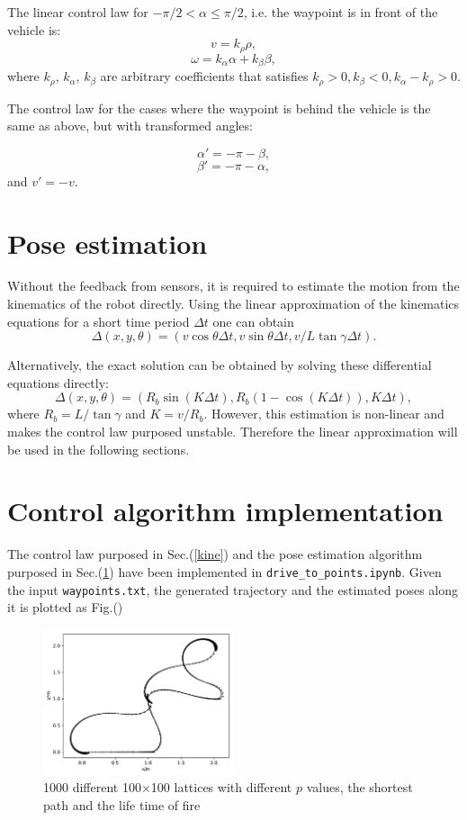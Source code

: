 \documentclass[12pt]{article}
\begin{document}
The linear control law for $-\pi/2<\alpha\le \pi/2$, i.e. the waypoint is in front of the vehicle is:
$$v=k_\rho \rho,$$
$$\omega=k_\alpha \alpha+k_\beta \beta,$$
where $k_\rho$, $k_\alpha$, $k_\beta$ are arbitrary coefficients that satisfies $k_\rho>0, k_\beta<0,k_\alpha-k_\rho>0.$

The control law for the cases where the waypoint is behind the vehicle is the same as above, but with transformed angles:

$$\alpha'=-\pi-\beta,$$
$$\beta'=-\pi-\alpha,$$
and $v'=-v$.

\section{Pose estimation}
\label{pose}
Without the feedback from sensors, it is required to estimate the motion from the kinematics of the robot directly. Using the linear approximation of the kinematics equations for a short time period $\Delta t$ one can obtain
$$\Delta(x,y,\theta)=(v\cos \theta \Delta t ,v \sin \theta \Delta t, v/L \tan \gamma \Delta t).$$

Alternatively, the exact solution can be obtained by solving these differential equations directly:
$$\Delta(x,y,\theta)=(R_b\sin(K\Delta t),R_b(1-\cos(K\Delta t)),K\Delta t),$$
where $R_b=L/\tan \gamma$ and $K=v/R_b$. However, this estimation is non-linear and makes the control law purposed unstable. Therefore the linear approximation will be used in the following sections.


\section{Control algorithm implementation}
The control law purposed in Sec.(\ref{kine}) and the pose estimation algorithm purposed in Sec.(\ref{pose}) have been implemented in \texttt{drive\_to\_points.ipynb}.  Given the input \texttt{waypoints.txt}, the generated trajectory and the estimated poses along it is plotted as Fig.()
\begin{figure}[htbp]
\centering
\includegraphics[width=0.5\textwidth]{../ideal_traj.pdf}
\caption{1000 different 100$\times$100 lattices with different $p$ values, the shortest path and the life time of fire}\label{fig3}
\end{figure}
\end{document}
